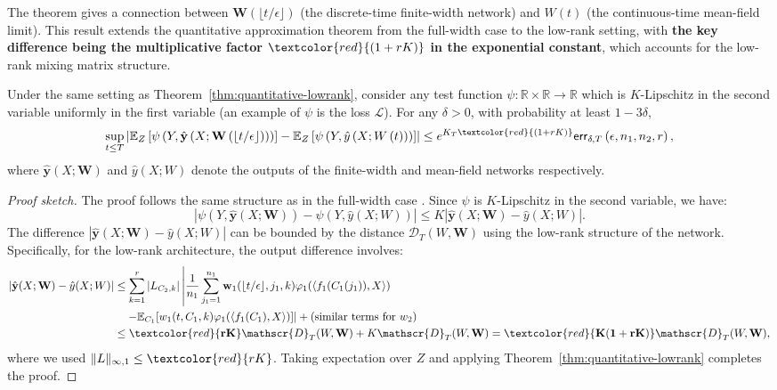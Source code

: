 The theorem gives a connection between $\mathbf{W}(\lfloor t/\epsilon\rfloor)$ (the discrete-time finite-width network) and $W(t)$ (the continuous-time mean-field limit). This result extends the quantitative approximation theorem from the full-width case \cite{nguyen2020global} to the low-rank setting, with \textbf{the key difference being the multiplicative factor $\textcolor{red}{(1+rK)}$ in the exponential constant}, which accounts for the low-rank mixing matrix structure.

\begin{corollary}
\label{cor:gradient-descent-quality-lowrank}
Under the same setting as Theorem~\ref{thm:quantitative-lowrank}, consider any test function $\psi:\mathbb{R}\times\mathbb{R}\to\mathbb{R}$ which is $K$-Lipschitz in the second variable uniformly in the first variable (an example of $\psi$ is the loss $\mathscr{L}$). For any $\delta>0$, with probability at least $1-3\delta$,
\[
\sup_{t\leq T}\left|\mathbb{E}_{Z}\left[\psi\left(Y,\hat{\mathbf{y}}\left(X;\mathbf{W}\left(\left\lfloor t/\epsilon\right\rfloor \right)\right)\right)\right]-\mathbb{E}_{Z}\left[\psi\left(Y,\hat{y}\left(X;W\left(t\right)\right)\right)\right]\right|\leq e^{K_T\textcolor{red}{(1+rK)}}\mathsf{err}_{\delta,T}\left(\epsilon,n_{1},n_{2},r\right),
\]
where $\hat{\mathbf{y}}(X; \mathbf{W})$ and $\hat{y}(X; W)$ denote the outputs of the finite-width and mean-field networks respectively.
\end{corollary}

\begin{proof}[Proof sketch]
The proof follows the same structure as in the full-width case \cite{nguyen2020global}. Since $\psi$ is $K$-Lipschitz in the second variable, we have:
\[
|\psi(Y, \hat{\mathbf{y}}(X; \mathbf{W})) - \psi(Y, \hat{y}(X; W))| \le K|\hat{\mathbf{y}}(X; \mathbf{W}) - \hat{y}(X; W)|.
\]
The difference $|\hat{\mathbf{y}}(X; \mathbf{W}) - \hat{y}(X; W)|$ can be bounded by the distance $\mathscr{D}_T(W, \mathbf{W})$ using the low-rank structure of the network. Specifically, for the low-rank architecture, the output difference involves:
\begin{align*}
|\hat{\mathbf{y}}(X; \mathbf{W}) - \hat{y}(X; W)| &\le \sum_{k=1}^r |L_{C_2,k}|\left|\frac{1}{n_1}\sum_{j_1=1}^{n_1}\mathbf{w}_1(\lfloor t/\epsilon\rfloor, j_1, k)\varphi_1(\langle f_1(C_1(j_1)), X\rangle)\right.\\
&\quad\left. - \mathbb{E}_{C_1}[w_1(t, C_1, k)\varphi_1(\langle f_1(C_1), X\rangle)]\right| + \text{(similar terms for $w_2$)}\\
&\le \textcolor{red}{\mathbf{rK}}\mathscr{D}_T(W, \mathbf{W}) + K\mathscr{D}_T(W, \mathbf{W}) = \textcolor{red}{\mathbf{K(1+rK)}}\mathscr{D}_T(W, \mathbf{W}),
\end{align*}
where we used $\|L\|_{\infty,1} \le \textcolor{red}{rK}$. Taking expectation over $Z$ and applying Theorem~\ref{thm:quantitative-lowrank} completes the proof.
\end{proof}

